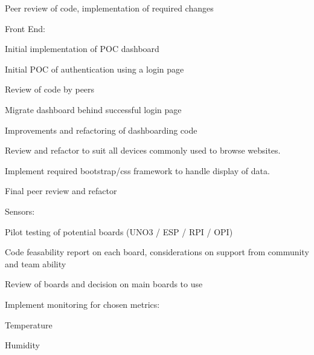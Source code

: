 \documentclass{article}
\begin{document}
\begin{legal}
\begin{legal}
                    \begin{legal}
                        \item Peer review of code, implementation of required changes
                    \end{legal}
                \end{legal}
                \item Front End:
                \begin{legal}
                    \item Initial implementation of POC dashboard
                    \item Initial POC of authentication using a login page
                    \item Review of code by peers
                    \item Migrate dashboard behind successful login page
                    \item Improvements and refactoring of dashboarding code
                    \item Review and refactor to suit all devices commonly used to browse websites.
                    \item Implement required bootstrap/css framework to handle display of data.
                    \item Final peer review and refactor
                \end{legal}
                \newpage
                \item Sensors:
                \begin{legal}
                    \item Pilot testing of potential boards (UNO3\cite{UNO3} / ESP\cite{ESP8266} / RPI\cite{RPI} / OPI\cite{OPI})
                    \begin{legal}
                        \item Code feasability report on each board, considerations on support from community 
                        and team ability
                        \item Review of boards and decision on main boards to use
                    \end{legal}
                    \item Implement monitoring for chosen metrics:
                    \begin{legal}
                        \item Temperature
                        \item Humidity

\end{legal}
\end{legal}
\end{legal}
\end{document}
